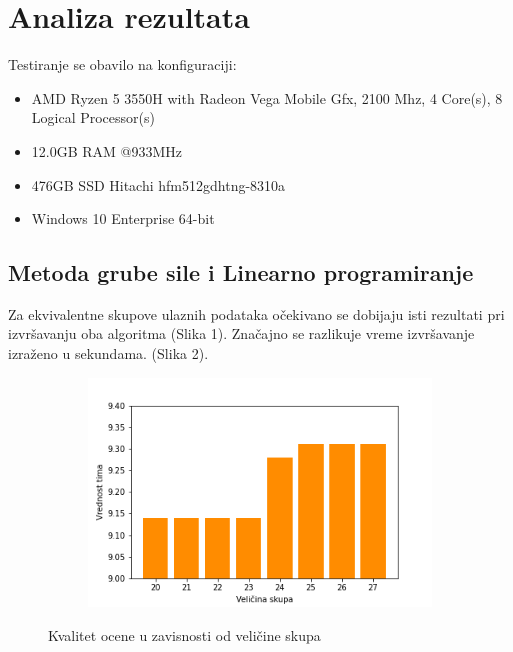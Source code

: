 \documentclass[a4paper]{article}
\begin{document}
\section{Analiza rezultata}

Testiranje se obavilo na konfiguraciji:
\vspace{3mm} 
\begin{itemize}
	\item AMD Ryzen 5 3550H with Radeon Vega Mobile Gfx, 2100 Mhz, 4 Core(s), 8 Logical Processor(s)
	\item 12.0GB RAM @933MHz
	\item 476GB SSD Hitachi hfm512gdhtng-8310a 
	\item Windows 10 Enterprise 64-bit

\end{itemize}



\subsection{Metoda grube sile i Linearno programiranje}

Za ekvivalentne skupove ulaznih podataka očekivano se dobijaju isti rezultati pri izvršavanju oba algoritma (Slika 1). Značajno se razlikuje vreme izvršavanje izraženo u sekundama. (Slika 2). 


\begin{figure}[H]
    \centering
    \begin{subfigure}{0.6\textwidth}
    \includegraphics[width = \textwidth]{img/performance_bar.png}
    \end{subfigure}
    \caption{Kvalitet ocene u zavisnosti od veličine skupa}
\end{figure}
\end{document}
